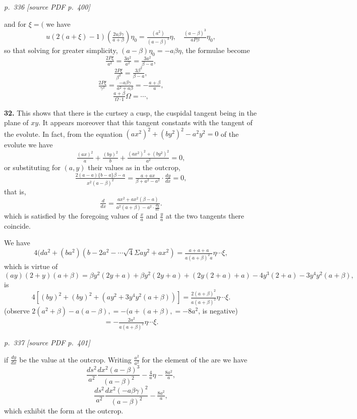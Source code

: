 \documentclass[11pt,a4paper]{article}
\newcommand{\pagemarker}[2]{\par\bigskip\noindent\textit{p.~#1 [source PDF p.~#2]}\par\smallskip}
\begin{document}
\clearpage

\pagemarker{336}{400}

and for $\xi = ($ we have
\[
u(2(a + \xi) - 1)\!\left(\tfrac{2u\beta\gamma}{a + \beta}\right)\eta_0 = \tfrac{(a^2)}{(a - \beta)^3}\eta, \quad \tfrac{(a - \beta)^3}{a P\beta}\eta_0,
\]
so that solving for greater simplicity, $(a - \beta)\eta_0 = -a\beta\eta$, the formulae become
\[
\tfrac{2P\xi}{a^2} = \tfrac{3a^2}{a^2} = \tfrac{3a^2}{\beta - a},
\]
\[
\tfrac{2P\xi}{\beta^2} = \tfrac{3\beta^2}{\beta - a},
\]
\[
\tfrac{2P\xi}{\gamma^2} = \tfrac{-a\beta\gamma}{a^2 + a\beta} = -\tfrac{a + \beta}{a},
\]
\[
\tfrac{a + \beta}{\Omega \cdot 1}\Omega = \cdots,
\]

\textbf{32.} This shows that there is the curtsey a cusp, the cuspidal tangent being in the plane of $xy$. It appears moreover that this tangent constants with the tangent of the evolute. In fact, from the equation $(a x^2)^2 + (b y^2)^2 - a^2 y^2 = 0$ of the evolute we have
\[
\tfrac{(a x)^2}{a} + \tfrac{(b y)^2}{b} + \tfrac{(a x^2)^2 + (b y^2)^2}{a^2} = 0,
\]
or substituting for $(a, y)$ their values as in the outcrop,
\[
\tfrac{2(a - a)\{b - a\}\beta - a}{x^2(a - \beta)^2} = \tfrac{a + a x}{\beta + a^2 - a^2}\cdot\tfrac{dy}{dx} = 0,
\]
that is,
\[
\tfrac{d}{dx} = \tfrac{a x^2 + a x^2(\beta - a)}{a^2(a + \beta) - a^2\cdot\tfrac{dy}{dx}}.
\]
which is satisfied by the foregoing values of $\tfrac{x}{a}$ and $\tfrac{y}{a}$ at the two tangents there coincide.

We have
\[
4(da^2 + (b a^2)(b - 2a^2 - \cdots\sqrt{4}\Sigma a y^2 + a x^2) = \tfrac{a + a + a}{a(a + \beta)^2 a}\eta\cdots\xi,
\]
which is virtue of
\[
(a y)(2 + y)(a + \beta) = \beta y^2(2y + a) + \beta y^2(2y + a) + (2y(2 + a) + a) - 4y^3(2 + a) - 3y^4 y^2(a + \beta),
\]
is
\[
4[(b y)^2 + (b y)^2 + (a y^2 + 3y^4 y^2(a + \beta))] = \tfrac{2(a + \beta)^2}{a(a + \beta)^2}\eta\cdots\xi.
\]
(observe $2(a^2 + \beta) - a(a - \beta), = -(a + (a + \beta), = -8a^2$, is negative)
\[
= -\tfrac{2a^2}{a(a + \beta)^2}\eta\cdots\xi.
\]

\clearpage

\pagemarker{337}{401}

if $\tfrac{dy}{dx}$ be the value at the outcrop. Writing $\tfrac{a^2}{a^2}$ for the element of the are we have
\[
\frac{ds^2}{a^2}\frac{dx^2(a - \beta)^3}{(a - \beta)^2} - \tfrac{4}{a}\eta - \tfrac{8a^2}{a},
\]
\[
\frac{ds^2}{a^2}\frac{dx^2(- a\beta\gamma)^2}{(a - \beta)^2} - \tfrac{8a^2}{a},
\]
which exhibit the form at the outcrop.
\end{document}
